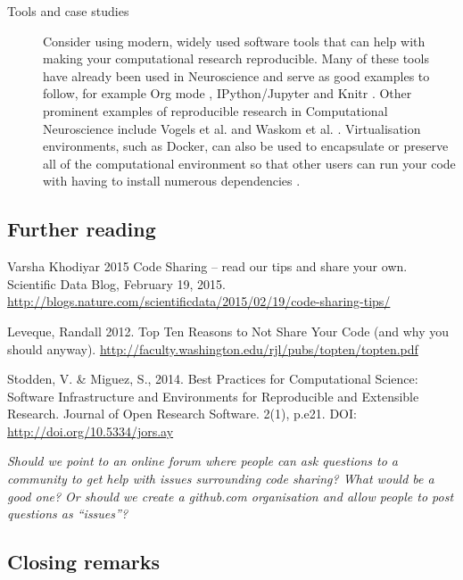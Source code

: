 \documentclass[11pt]{article}
\begin{document}
\begin{description}
\item [Tools and case studies] Consider using modern, widely used software tools that can help with making your computational research reproducible.  Many of
  these tools have already been used in Neuroscience and serve as good
  examples to follow, for example Org mode \cite{Delescluse2011},
  IPython/Jupyter \cite{Stevens2013} and Knitr \cite{Eglen2014}.  Other
  prominent examples of reproducible research in Computational
  Neuroscience include Vogels et al. \cite{Vogels2011-c8c} and Waskom et al. \cite{Waskom2014-gd}.
  Virtualisation environments, such as Docker, can also be used to
  encapsulate or preserve all of the computational environment so that
  other users can run your code with having to install numerous dependencies \cite{Boettiger2015}.
  

\end{description}

\subsection*{Further reading}

Varsha Khodiyar 2015 Code Sharing – read our tips and share your own. Scientific Data Blog, February 19, 2015. \url{http://blogs.nature.com/scientificdata/2015/02/19/code-sharing-tips/}

Leveque, Randall 2012. Top Ten Reasons to Not Share Your Code (and why you should anyway). 
\url{http://faculty.washington.edu/rjl/pubs/topten/topten.pdf}

Stodden, V. \& Miguez, S., 2014. Best Practices for Computational Science: Software Infrastructure and Environments for Reproducible and Extensible Research. Journal of Open Research Software. 2(1), p.e21. DOI: \url{http://doi.org/10.5334/jors.ay}


\textit{Should we point to an online forum where people can ask
  questions to a community to get help with issues surrounding code
  sharing?  What would be a good one?  Or should we create a
  github.com organisation and allow people to post questions as
  ``issues''?}


\subsection*{Closing remarks}
\end{document}
